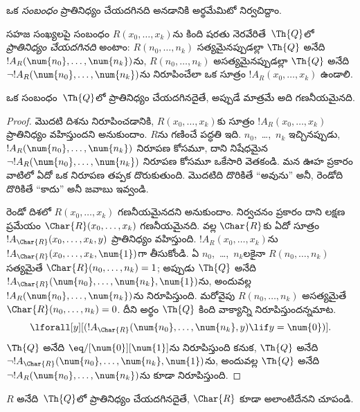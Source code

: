 \documentclass[../../../include/open-logic-section]{subfiles}
\begin{document}


ఒక \emph{సంబంధం} ప్రాతినిధ్యం చేయదగినది అనడానికి అర్థమేమిటో నిర్వచిద్దాం.

\begin{defn}
 సహజ సంఖ్యలపై సంబంధం
$R(x_0,\dots,x_k)$ను కింది షరతు నెరవేరితే~$\Th{Q}$లో
\emph{ప్రాతినిధ్యం చేయదగినది} అంటాం: $R(n_0,\dots,n_k)$ సత్యమైనప్పుడల్లా
$\Th{Q}$ అనేది $!A_R(\num{n_0},\dots,\num{n_k})$ను, $R(n_0,\dots,n_k)$ అసత్యమైనప్పుడల్లా
$\Th{Q}$ అనేది $\lnot !A_R(\num{n_0},\dots,\num{n_k})$ను నిరూపించేలా ఒక
సూత్రం $!A_R(x_0,\dots,x_k)$ ఉండాలి.
\end{defn}

\begin{thm}
 ఒక సంబంధం~$\Th{Q}$లో ప్రాతినిధ్యం
చేయదగినదైతే, అప్పుడే మాత్రమే అది గణనీయమైనది.
\end{thm}

\begin{proof}
మొదటి దిశను నిరూపించడానికి, $R(x_0,\dots,x_k)$కు సూత్రం
$!A_R(x_0,\dots,x_k)$ ప్రాతినిధ్యం వహిస్తుందని అనుకుందాం. $R$ను గణించే
పద్ధతి ఇది. $n_0$,~\dots,~$n_k$ ఇచ్చినప్పుడు,
$!A_R(\num{n_0},\dots,\num{n_k})$ నిరూపణ కోసమూ, దాని నిషేధమైన
$\lnot !A_R(\num{n_0},\dots,\num{n_k})$ నిరూపణ కోసమూ ఒకేసారి వెతకండి.
మన ఊహ ప్రకారం వాటిలో ఏదో ఒక నిరూపణ తప్పక దొరుకుతుంది. మొదటిది దొరికితే
``అవును'' అనీ, రెండోది దొరికితే ``కాదు'' అనీ జవాబు ఇవ్వండి.

రెండో దిశలో $R(x_0,\dots,x_k)$ గణనీయమైనదని అనుకుందాం.
నిర్వచనం ప్రకారం దాని లక్షణ ప్రమేయం $\Char{R}(x_0,\dots,x_k)$ గణనీయమైనది.
 వల్ల $\Char{R}$కు ఏదో సూత్రం
$!A_{\Char{R}}(x_0,\dots,x_k,y)$ ప్రాతినిధ్యం వహిస్తుంది.
$!A_R(x_0,\dots,x_k)$ను $!A_{\Char{R}}(x_0,\dots,x_k,\num{1})$గా
తీసుకోండి. ఏ $n_0$,~\dots,~$n_k$లకైనా $R(n_0,\dots,n_k)$ సత్యమైతే
$\Char{R}(n_0,\dots,n_k)=1$; అప్పుడు $\Th{Q}$ అనేది
$!A_{\Char{R}}(\num{n_0},\dots,\num{n_k},\num{1})$ను, అందువల్ల
$!A_R(\num{n_0},\dots,\num{n_k})$ను నిరూపిస్తుంది. మరోవైపు
$R(n_0,\dots,n_k)$ అసత్యమైతే $\Char{R}(n_0,\dots,n_k)=0$. దీని అర్థం
$\Th{Q}$ కింది వాక్యాన్ని నిరూపిస్తుందన్నమాట.
\[
\lforall[y][(!A_{\Char{R}}(\num{n_0}, \dots, \num{n_k}, y) \lif y =
  \num{0})].
\]
$\Th{Q}$ అనేది $\eq/[\num{0}][\num{1}]$ను నిరూపిస్తుంది కనుక,
$\Th{Q}$ అనేది $\lnot !A_{\Char{R}}(\num{n_0},\dots,\num{n_k},\num{1})$ను,
అందువల్ల $\Th{Q}$ అనేది $\lnot !A_R(\num{n_0},\dots,\num{n_k})$ను కూడా నిరూపిస్తుంది.
\end{proof}

\begin{prob}
$R$ అనేది~$\Th{Q}$లో ప్రాతినిధ్యం చేయదగినదైతే, $\Char{R}$ కూడా అలాంటిదేనని
చూపండి.
\end{prob}
\end{document}
